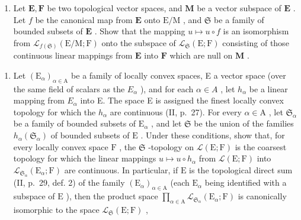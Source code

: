 \begin{enumerate}
\def\labelenumi{\alph{enumi})}
\setcounter{enumi}{1}
\tightlist
\item
  Let \(\mathbf{E},\mathbf{F}\) be two topological vector spaces, and \(\mathbf{M}\) be a vector subspace of \(\mathbf{E}\) . Let \(f\) be the canonical map from \(\mathbf{E}\) onto \(\mathrm{E / M}\) , and \(\mathfrak{S}\) be a family of bounded subsets of \(\mathbf{E}\) . Show that the mapping \(u\mapsto u\circ f\) is an isomorphism from \(\mathcal{L}_{f(\mathfrak{S})}(\mathrm{E / M};\mathrm{F})\) onto the subspace of \(\mathcal{L}_{\mathfrak{S}}(\mathrm{E};\mathrm{F})\) consisting of those continuous linear mappings from \(\mathbf{E}\) into \(\mathbf{F}\) which are null on \(\mathbf{M}\) .
\end{enumerate}

\begin{enumerate}
\def\labelenumi{\arabic{enumi})}
\setcounter{enumi}{4}
\tightlist
\item
  Let \((\mathrm{E}_{\alpha})_{\alpha\in\mathrm{A}}\) be a family of locally convex spaces, E a vector space (over the same field of scalars as the \(E_{\alpha}\) ), and for each \(\alpha\in A\) , let \(h_{\alpha}\) be a linear mapping from \(E_{\alpha}\) into E. The space E is assigned the finest locally convex topology for which the \(h_{\alpha}\) are continuous (II, p.~27). For every \(\alpha \in \mathrm{A}\) , let \(\mathfrak{S}_{\alpha}\) be a family of bounded subsets of \(\mathrm{E}_{\alpha}\) , and let \(\mathfrak{S}\) be the union of the families \(h_{\alpha}(\mathfrak{S}_{\alpha})\) of bounded subsets of \(\mathrm{E}\) . Under these conditions, show that, for every locally convex space \(\mathrm{F}\) , the \(\mathfrak{S}\) -topology on \(\mathcal{L}(\mathrm{E};\mathrm{F})\) is the coarsest topology for which the linear mappings \(u\mapsto u\circ h_{\alpha}\) from \(\mathcal{L}(\mathrm{E};\mathrm{F})\) into \(\mathcal{L}_{\mathfrak{S}_{\alpha}}(\mathrm{E}_{\alpha};\mathrm{F})\) are continuous. In particular, if \(\mathrm{E}\) is the topological direct sum (II, p.~29, def. 2) of the family \((\mathrm{E}_{\alpha})_{\alpha \in \mathrm{A}}\) (each \(\mathrm{E}_{\alpha}\) being identified with a subspace of \(\mathrm{E}\) ), then the product space \(\prod_{\alpha \in \mathrm{A}}\mathcal{L}_{\mathfrak{S}_{\alpha}}(\mathrm{E}_{\alpha};\mathrm{F})\) is canonically isomorphic to the space \(\mathcal{L}_{\mathfrak{S}}(\mathrm{E};\mathrm{F})\) ,
\end{enumerate}

